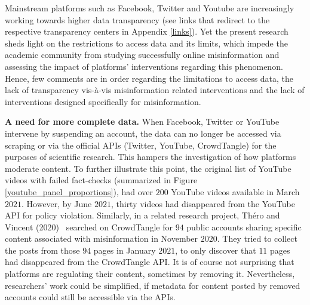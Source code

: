\documentclass{article}
\begin{document}
\smallskip

Mainstream platforms such as Facebook, Twitter and Youtube are increasingly working towards higher data transparency (see links that redirect to the respective transparency centers in Appendix \ref{links}). 
Yet the present research sheds light on the restrictions to access data and its limits, which impede the academic community from studying successfully online misinformation and assessing the impact of platforms' interventions regarding this phenomenon. 
Hence, few comments are in order regarding the limitations to access data, the lack of transparency vis-\`{a}-vis misinformation related interventions and the lack of interventions designed specifically for misinformation. 

\smallskip

{\bf A need for more complete data.} 
When Facebook, Twitter or YouTube intervene by suspending an account, the data can no longer be accessed via scraping or via the official APIs (Twitter, YouTube, CrowdTangle) for the purposes of scientific research. 
This hampers the investigation of how platforms moderate content. 
To further illustrate this point, the original list of YouTube videos with failed fact-checks (summarized in Figure \ref{youtube_panel_proportions}), had over $200$ YouTube videos available in March $2021$. 
However, by June $2021$, thirty videos had disappeared from the YouTube API for policy violation. 
Similarly, in a related research project, Th\'{e}ro and Vincent (2020)~\cite{therovincent} searched on CrowdTangle for $94$ public accounts sharing specific content associated with misinformation in November $2020$. 
They tried to collect the posts from those $94$ pages in January $2021$, to only discover that $11$ pages had disappeared from the CrowdTangle API.
It is of course not surprising that platforms are regulating their content, sometimes by removing it. 
Nevertheless, researchers' work could be simplified, if metadata for content posted by removed accounts could still be accessible via the APIs.
\end{document}
